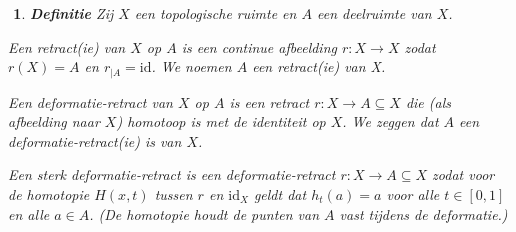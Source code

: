 \documentclass[12pt]{book}
\newtheorem{dfh}[stelh]{$\!\!$}
\newenvironment{df}{\begin{dfh} \em {\bf Definitie }}{\end{dfh}}
\begin{document}
\begin{df} Zij $X$ een topologische ruimte en $A$ een deelruimte van $X$.

Een  {\em retract}(ie) van $X$ op $A$ is een continue afbeelding $r:X\to X$ zodat $r(X)=A$ en
$r_{|A}=\mbox{id}$. We noemen $A$ een {\em retract(ie)} van X.

Een  {\em deformatie-retract} van $X$ op $A$ is een retract $r:X\to A\subseteq X$ die (als afbeelding naar $X$) homotoop is met de identiteit op $X$. We zeggen dat $A$ een  {\em deformatie-retract(ie)} is van $X$.
 
Een  {\em sterk deformatie-retract} is een deformatie-retract $r: X\to A\subseteq X$ zodat voor de homotopie $H(x,t)$ tussen $r$ en $\mbox{id}_{X}$ geldt dat $h_t(a)=a$ voor alle $t\in [0,1]$ en alle $a\in A$. (De homotopie houdt de punten van $A$ vast tijdens de deformatie.)
\end{df}
\end{document}
